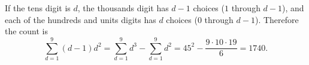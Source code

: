 If the tens digit is $d$, the thousands digit has $d-1$ choices ($1$ through $d-1$), and each of the hundreds and units digits has $d$ choices ($0$ through $d-1$). Therefore the count is
\[
\sum_{d=1}^9(d-1)d^2
=\sum_{d=1}^9d^3-\sum_{d=1}^9d^2
=45^2-\dfrac{9\cdot10\cdot19}{6}
=\boxed{1740}.
\]
